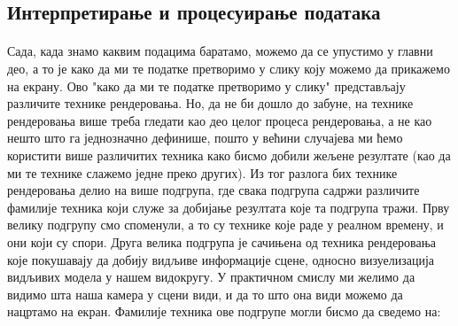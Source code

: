 \documentclass[12pt]{article}
\begin{document}
	\subsection{Интерпретирање и процесуирање података}
	\paragraph{}
	Сада, када знамо каквим подацима баратамо, можемо да се упустимо у главни део, а то је како да ми те податке претворимо у слику коју можемо да прикажемо на екрану. Ово "како да ми те податке претворимо у слику" представљају различите технике рендеровања. Но, да не би дошло до забуне, на технике рендеровања више треба гледати као део целог процеса рендеровања, а не као нешто што га једнозначно дефинише, пошто у већини случајева ми ћемо користити више различитих техника како бисмо добили жељене резултате (као да ми те технике слажемо једне преко других). Из тог разлога бих технике рендеровања делио на више подгрупа, где свака подгрупа садржи различите фамилије техника који служе за добијање резултата које та подгрупа тражи. Прву велику подгрупу смо споменули, а то су технике које раде у реалном времену, и они који су спори. Друга велика подгрупа је сачињена од техника рендеровања које покушавају да добију видљиве информације сцене, односно визуелизација видљивих модела у нашем видокругу. У практичном смислу ми желимо да видимо шта наша камера у сцени види, и да то што она види можемо да нацртамо на екран. Фамилије техника ове подгрупе могли бисмо да сведемо на:
\end{document}
